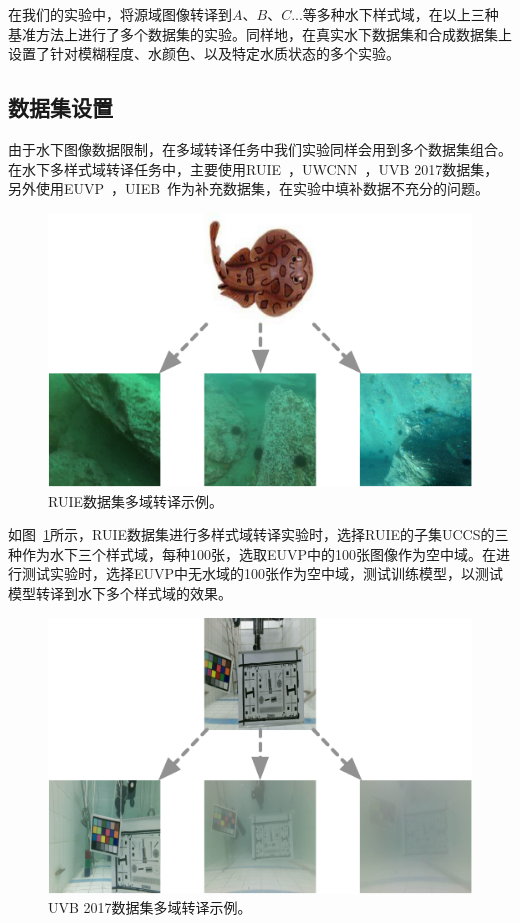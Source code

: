 在我们的实验中，将源域图像转译到$A$、$B$、$C$...等多种水下样式域，在以上三种基准方法上进行了多个数据集的实验。同样地，在真实水下数据集和合成数据集上设置了针对模糊程度、水颜色、以及特定水质状态的多个实验。

\subsection{数据集设置}
由于水下图像数据限制，在多域转译任务中我们实验同样会用到多个数据集组合。在水下多样式域转译任务中，主要使用RUIE~\cite{liu2019real}，UWCNN~\cite{li2020underwater}，UVB 2017数据集，另外使用EUVP~\cite{islam2019fast}，UIEB~\cite{li2019underwater}作为补充数据集，在实验中填补数据不充分的问题。

\begin{figure}[ht]
    \centering
  \includegraphics[width=\textwidth]{figures/RUIE_dataset_domain.pdf}
  \caption{RUIE数据集多域转译示例。}
  \label{fig:ruie_domain}
\end{figure}

如图~\ref{fig:ruie_domain}所示，RUIE数据集进行多样式域转译实验时，选择RUIE的子集UCCS的三种作为水下三个样式域，每种100张，选取EUVP中的100张图像作为空中域。在进行测试实验时，选择EUVP中无水域的100张作为空中域，测试训练模型，以测试模型转译到水下多个样式域的效果。

\begin{figure}[ht]
    \centering
  \includegraphics[width=\textwidth]{figures/UVB_dataset_domain.pdf}
  \caption{UVB 2017数据集多域转译示例。}
  \label{fig:uvb_domain}
\end{figure}

